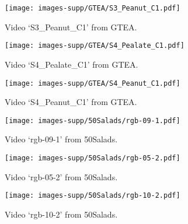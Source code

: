 \documentclass[10pt,twocolumn,letterpaper]{article}
\begin{document}
\begin{figure}[h]
\vspace{-0.3cm}
\begin{center}
   \texttt{[image: images-supp/GTEA/S3\_Peanut\_C1.pdf]}
\end{center}
   \caption{Video `S3\_Peanut\_C1' from GTEA.}
\label{fig:GTEA-4}
\end{figure}

\begin{figure}[h]
\vspace{-0.3cm}
\begin{center}
   \texttt{[image: images-supp/GTEA/S4\_Pealate\_C1.pdf]}
\end{center}
   \caption{Video `S4\_Pealate\_C1' from GTEA.}
\label{fig:GTEA-5}
\end{figure}


\begin{figure}[h]
\vspace{-0.3cm}
\begin{center}
   \texttt{[image: images-supp/GTEA/S4\_Peanut\_C1.pdf]}
\end{center}
   \caption{Video `S4\_Peanut\_C1' from GTEA.}
\label{fig:GTEA-6}
\end{figure}




\begin{figure}[h]
\vspace{-0.3cm}
\begin{center}
   \texttt{[image: images-supp/50Salads/rgb-09-1.pdf]}
\end{center}
   \caption{Video `rgb-09-1' from 50Salads.}
\label{fig:50Salads-1}
\end{figure}

\begin{figure}[h]
\vspace{-0.3cm}
\begin{center}
   \texttt{[image: images-supp/50Salads/rgb-05-2.pdf]}
\end{center}
   \caption{Video `rgb-05-2' from 50Salads.}
\label{fig:50Salads-2}
\end{figure}

\begin{figure}[h]
\vspace{-0.3cm}
\begin{center}
   \texttt{[image: images-supp/50Salads/rgb-10-2.pdf]}
\end{center}
   \caption{Video `rgb-10-2' from 50Salads.}
\label{fig:50Salads-3}
\end{figure}
\end{document}
